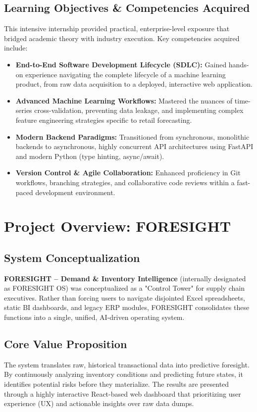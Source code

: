 \documentclass[12pt,a4paper]{report}
\begin{document}
\section{Learning Objectives \& Competencies Acquired}
This intensive internship provided practical, enterprise-level exposure that bridged academic theory with industry execution. Key competencies acquired include:
\begin{itemize}
    \item \textbf{End-to-End Software Development Lifecycle (SDLC):} Gained hands-on experience navigating the complete lifecycle of a machine learning product, from raw data acquisition to a deployed, interactive web application.
    \item \textbf{Advanced Machine Learning Workflows:} Mastered the nuances of time-series cross-validation, preventing data leakage, and implementing complex feature engineering strategies specific to retail forecasting.
    \item \textbf{Modern Backend Paradigms:} Transitioned from synchronous, monolithic backends to asynchronous, highly concurrent API architectures using FastAPI and modern Python (type hinting, async/await).
    \item \textbf{Version Control \& Agile Collaboration:} Enhanced proficiency in Git workflows, branching strategies, and collaborative code reviews within a fast-paced development environment.
\end{itemize}

\chapter{Project Overview: FORESIGHT}

\section{System Conceptualization}
\textbf{FORESIGHT – Demand \& Inventory Intelligence} (internally designated as FORESIGHT OS) was conceptualized as a "Control Tower" for supply chain executives. Rather than forcing users to navigate disjointed Excel spreadsheets, static BI dashboards, and legacy ERP modules, FORESIGHT consolidates these functions into a single, unified, AI-driven operating system.

\section{Core Value Proposition}
The system translates raw, historical transactional data into predictive foresight. By continuously analyzing inventory conditions and predicting future states, it identifies potential risks before they materialize. The results are presented through a highly interactive React-based web dashboard that prioritizing user experience (UX) and actionable insights over raw data dumps.
\end{document}
